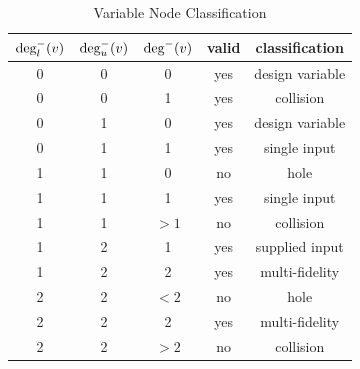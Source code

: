 \begin{table}[htbp]
  \centering
  \caption{Variable Node Classification}
    \begin{tabular}{ccccc}
    \toprule
    $\textrm{deg}^-_l(v)$ & $\textrm{deg}^-_u(v)$ & $\textrm{deg}^-(v)$ & valid & classification \\
    \midrule
    0     & 0     & 0     & yes   & design variable \\
    0     & 0     & 1     & yes   & collision \\
    0     & 1     & 0     & yes   & design variable \\
    0     & 1     & 1     & yes   & single input \\
    1     & 1     & 0     & no    & hole \\
    1     & 1     & 1     & yes   & single input \\
    1     & 1     & $>1$ & no    & collision \\
    1     & 2     & 1     & yes   & supplied input \\
    1     & 2     & 2     & yes   & multi-fidelity \\
    2     & 2     & $<2$ & no    & hole \\
    2     & 2     & 2     & yes   & multi-fidelity \\
    2     & 2     & $>2$     & no   & collision \\
    \bottomrule
    \end{tabular}%
  \label{t:variable node classification}%
\end{table}%




